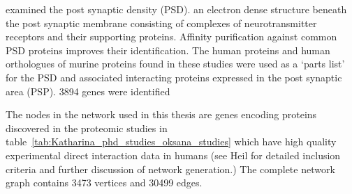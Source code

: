 examined the post synaptic density (PSD).
an electron dense structure beneath the post synaptic membrane \cite{PALAY1956}  consisting of complexes of neurotransmitter receptors and their supporting proteins. \cite{kennedy2000signal}  Affinity purification against common PSD proteins improves their identification. \cite{ewing2007large}  
The human proteins and human orthologues of murine proteins found in these studies were used as a ‘parts list’ for the PSD and associated interacting proteins expressed in the post synaptic area (PSP). 3894 genes were identified 

 The nodes in the network used in this thesis are genes encoding proteins discovered in the proteomic studies in table~\ref{tab:Katharina_phd_studies_oksana_studies} which have high quality experimental direct interaction data in humans  %
 (see Heil \cite{heil2018systems} for detailed inclusion criteria and further discussion of network generation.)
The complete network graph contains 3473 vertices and 30499 edges. 
 





